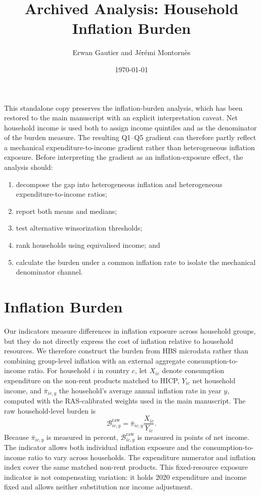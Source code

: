 \documentclass[12pt]{article}
\title{Archived Analysis: Household Inflation Burden}
\author{Erwan Gautier and J\'er\'emi Montorn\`es}
\date{\today}
\begin{document}
\maketitle

This standalone copy preserves the inflation-burden analysis, which has been restored to the main
manuscript with an explicit interpretation caveat. Net household income is used both to assign
income quintiles and as the denominator of the burden measure. The resulting Q1--Q5 gradient can
therefore partly reflect a mechanical expenditure-to-income gradient rather than heterogeneous
inflation exposure. Before interpreting the gradient as an inflation-exposure effect, the analysis
should:
\begin{enumerate}[nosep]
  \item decompose the gap into heterogeneous inflation and heterogeneous expenditure-to-income ratios;
  \item report both means and medians;
  \item test alternative winsorization thresholds;
  \item rank households using equivalised income; and
  \item calculate the burden under a common inflation rate to isolate the mechanical denominator channel.
\end{enumerate}

\section{Inflation Burden}

Our indicators measure differences in inflation exposure across household groups, but they do
not directly express the cost of inflation relative to household resources. We therefore construct
the burden from HBS microdata rather than combining group-level inflation with an external aggregate
consumption-to-income ratio. For household $i$ in country $c$, let $X_{ic}$ denote consumption
expenditure on the non-rent products matched to HICP, $Y_{ic}$ net household income, and
$\bar{\pi}_{ic,y}$ the household's average annual inflation rate in year $y$, computed with the
RAS-calibrated weights used in the main manuscript. The raw household-level burden is
\begin{equation}
\mathcal{B}^{\mathrm{raw}}_{ic,y}=\bar{\pi}_{ic,y}\frac{X_{ic}}{Y_{ic}}.
\end{equation}
Because $\bar{\pi}_{ic,y}$ is measured in percent, $\mathcal{B}^{\mathrm{raw}}_{ic,y}$ is measured in
points of net income. The indicator allows both individual inflation exposure and the
consumption-to-income ratio to vary across households. The expenditure numerator and inflation
index cover the same matched non-rent products. This fixed-resource exposure indicator is not
compensating variation: it holds 2020 expenditure and income fixed and allows neither substitution
nor income adjustment.
\end{document}
